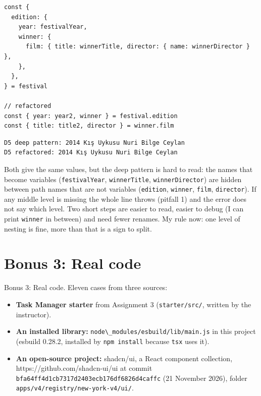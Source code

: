 \documentclass[
]{article}
\newcommand{\passthrough}[1]{#1}
\providecommand{\tightlist}{%
  \setlength{\itemsep}{0pt}\setlength{\parskip}{0pt}}
\begin{document}
\begin{lstlisting}
const {
  edition: {
    year: festivalYear,
    winner: {
      film: { title: winnerTitle, director: { name: winnerDirector } },
    },
  },
} = festival

// refactored
const { year: year2, winner } = festival.edition
const { title: title2, director } = winner.film
\end{lstlisting}

\begin{lstlisting}
D5 deep pattern: 2014 Kış Uykusu Nuri Bilge Ceylan
D5 refactored: 2014 Kış Uykusu Nuri Bilge Ceylan
\end{lstlisting}

Both give the same values, but the deep pattern is hard to read: the
names that become variables (\passthrough{\lstinline!festivalYear!},
\passthrough{\lstinline!winnerTitle!},
\passthrough{\lstinline!winnerDirector!}) are hidden between path names
that are not variables (\passthrough{\lstinline!edition!},
\passthrough{\lstinline!winner!}, \passthrough{\lstinline!film!},
\passthrough{\lstinline!director!}). If any middle level is missing the
whole line throws (pitfall 1) and the error does not say which level.
Two short steps are easier to read, easier to debug (I can print
\passthrough{\lstinline!winner!} in between) and need fewer renames. My
rule now: one level of nesting is fine, more than that is a sign to
split.

\hypertarget{bonus-3-real-code}{%
\section{Bonus 3: Real code}\label{bonus-3-real-code}}

Bonus 3: Real code. Eleven cases from three sources:

\begin{itemize}
\tightlist
\item
  \textbf{Task Manager starter} from Assignment 3
  (\passthrough{\lstinline!starter/src/!}, written by the instructor).
\item
  \textbf{An installed library:}
  \passthrough{\lstinline!node\_modules/esbuild/lib/main.js!} in this
  project (esbuild 0.28.2, installed by
  \passthrough{\lstinline!npm install!} because
  \passthrough{\lstinline!tsx!} uses it).
\item
  \textbf{An open-source project:} shadcn/ui, a React component
  collection, https://github.com/shadcn-ui/ui at commit
  \passthrough{\lstinline!bfa64ff4d1cb7317d2403ecb176df6826d4caffc!} (21
  November 2026), folder
  \passthrough{\lstinline!apps/v4/registry/new-york-v4/ui/!}.
\end{itemize}
\end{document}
